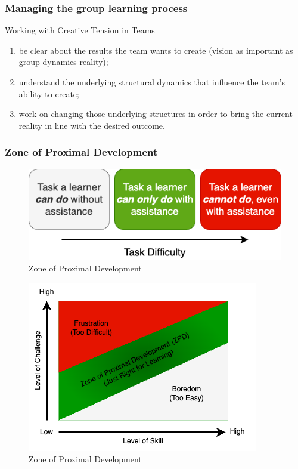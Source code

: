 \documentclass[
]{book}
\providecommand{\tightlist}{%
  \setlength{\itemsep}{0pt}\setlength{\parskip}{0pt}}
\begin{document}
\hypertarget{managing-the-group-learning-process}{%
\subsubsection*{Managing the group learning process}\label{managing-the-group-learning-process}}

Working with Creative Tension in Teams

\begin{enumerate}
\def\labelenumi{\arabic{enumi}.}
\tightlist
\item
  be clear about the results the team wants to create (vision as important as group dynamics reality);
\item
  understand the underlying structural dynamics that influence the team's ability to create;
\item
  work on changing those underlying structures in order to bring the current reality in line with the desired outcome.
\end{enumerate}

\hypertarget{zone-of-proximal-development-1}{%
\subsubsection*{Zone of Proximal Development}\label{zone-of-proximal-development-1}}

\begin{figure}
\centering
\includegraphics{assets/presentations/facilitation/zpd.drawio.png}
\caption{Zone of Proximal Development}
\end{figure}

\begin{figure}
\centering
\includegraphics{assets/presentations/facilitation/zpd2.drawio.png}
\caption{Zone of Proximal Development}
\end{figure}
\end{document}

